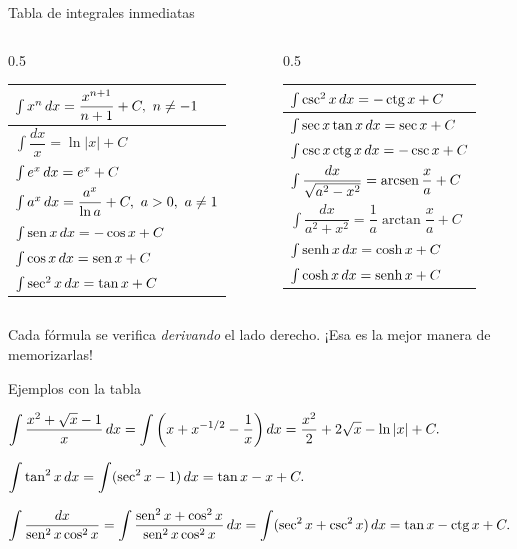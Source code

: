 \documentclass[10pt,aspectratio=169]{beamer}
\begin{document}
\begin{frame}{Tabla de integrales inmediatas}
  \small
  \begin{columns}[t]
    \begin{column}{0.5\textwidth}
      \renewcommand{\arraystretch}{2.1}
      \begin{tabular}{|l|}
        \hline
        $\int x^n\,dx=\dfrac{x^{n+1}}{n+1}+C,\ n\neq-1$\\ \hline
        $\int \dfrac{dx}{x}=\ln|x|+C$\\ \hline
        $\int e^x\,dx=e^x+C$\\ \hline
        $\int a^x\,dx=\dfrac{a^x}{\ln a}+C,\ a>0,\ a\ne1$\\ \hline
        $\int \operatorname{sen} x\,dx=-\cos x+C$\\ \hline
        $\int \cos x\,dx=\operatorname{sen} x+C$\\ \hline
        $\int \sec^2 x\,dx=\tan x+C$\\ \hline
      \end{tabular}
    \end{column}
    \begin{column}{0.5\textwidth}
      \renewcommand{\arraystretch}{2.1}
      \begin{tabular}{|l|}
        \hline
        $\int \operatorname{csc}^2 x\,dx=-\operatorname{ctg} x+C$\\ \hline
        $\int \sec x\tan x\,dx=\sec x+C$\\ \hline
        $\int \operatorname{csc} x\operatorname{ctg} x\,dx=-\operatorname{csc} x+C$\\ \hline
        $\int \dfrac{dx}{\sqrt{a^2-x^2}}=\operatorname{arcsen}\dfrac{x}{a}+C$\\ \hline
        $\int \dfrac{dx}{a^2+x^2}=\dfrac1a\arctan\dfrac{x}{a}+C$\\ \hline
        $\int \operatorname{senh} x\,dx=\cosh x+C$\\ \hline
        $\int \cosh x\,dx=\operatorname{senh} x+C$\\ \hline
      \end{tabular}
    \end{column}
  \end{columns}
  \vspace{2mm}
  \begin{idea}
    Cada fórmula se verifica \emph{derivando} el lado derecho. ¡Esa es la mejor manera de memorizarlas!
  \end{idea}
\end{frame}

\begin{frame}{Ejemplos con la tabla}
  \begin{ejemplo}[1]
    $\displaystyle\int \frac{x^2+\sqrt{x}-1}{x}\,dx=\int\left(x+x^{-1/2}-\frac1x\right)dx
    =\frac{x^2}{2}+2\sqrt{x}-\ln|x|+C.$
  \end{ejemplo}
  \begin{ejemplo}[2]
    $\displaystyle\int \tan^2 x\,dx=\int(\sec^2x-1)\,dx=\tan x-x+C.$
  \end{ejemplo}
  \begin{ejemplo}[3]
    $\displaystyle\int \frac{dx}{\operatorname{sen}^2x\cos^2x}=\int\frac{\operatorname{sen}^2x+\cos^2x}{\operatorname{sen}^2x\cos^2x}\,dx
    =\int(\sec^2x+\operatorname{csc}^2x)\,dx=\tan x-\operatorname{ctg} x+C.$
  \end{ejemplo}
\end{frame}
\end{document}
